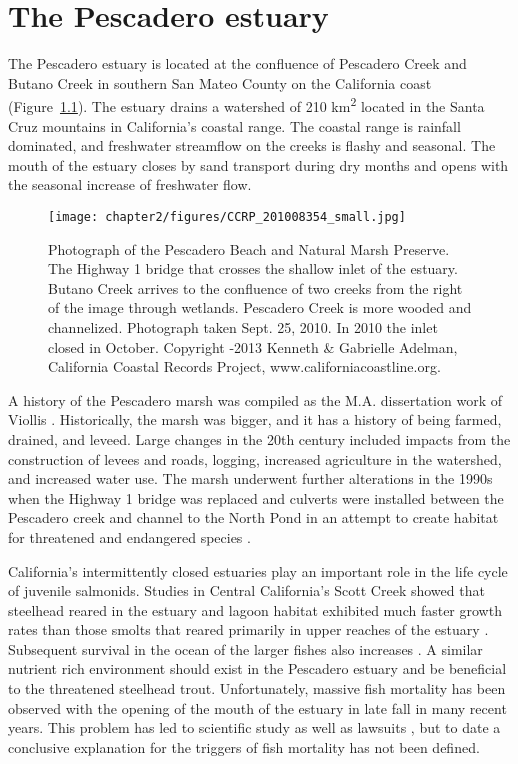 \chapter{The Pescadero estuary} \label{chPescadero}

The Pescadero estuary is located at the confluence of Pescadero Creek and Butano Creek in southern San Mateo County on the California coast (Figure~\ref{fig:ccrp_2010}). The estuary drains a watershed of 210 km\textsuperscript{2} located in the Santa Cruz mountains in California's coastal range. The coastal range is rainfall dominated, and freshwater streamflow on the creeks is flashy and seasonal. The mouth of the estuary closes by sand transport during dry months and opens with the seasonal increase of freshwater flow. 


\begin{figure}
\texttt{[image: chapter2/figures/CCRP\_201008354\_small.jpg]} \caption{Photograph of the Pescadero Beach and Natural Marsh Preserve. The Highway 1 bridge that crosses the shallow inlet of the estuary. Butano Creek arrives to the confluence of two creeks from the right of the image through wetlands. Pescadero Creek is more wooded and channelized. Photograph taken Sept. 25, 2010. In 2010 the inlet closed in October. Copyright -2013 Kenneth \& Gabrielle Adelman, California Coastal Records Project, www.californiacoastline.org.} \label{fig:ccrp_2010} \end{figure}

A history of the Pescadero marsh was compiled as the M.A. dissertation work of Viollis \parencite*{viollis_evolution_1979}. Historically, the marsh was bigger, and it has a history of being farmed, drained, and leveed. Large changes in the 20th century included impacts from the construction of levees and roads, logging, increased agriculture in the watershed, and increased water use. The marsh underwent further alterations in the 1990s when the Highway 1 bridge was replaced and culverts were installed between the Pescadero creek and channel to the North Pond in an attempt to create habitat for threatened and endangered species \parencite{esa_pescadero-butano_2004}.

California's intermittently closed estuaries play an important role in the life cycle of juvenile salmonids. Studies in Central California's Scott Creek showed that steelhead reared in the estuary and lagoon habitat exhibited much faster growth rates than those smolts that reared primarily in upper reaches of the estuary \parencite{hayes_steelhead_2008}. Subsequent survival in the ocean of the larger fishes also increases \parencite{bond_marine_2008}. A similar nutrient rich environment should exist in the Pescadero estuary and be beneficial to the threatened steelhead trout. Unfortunately, massive fish mortality has been observed with the opening of the mouth of the estuary in late fall in many recent years. This problem has led to scientific study \parencite{sloan_ecological_2006, smith_inorganic_2009} as well as lawsuits \parencite{scheck_tiny_2012}, but to date a conclusive explanation for the triggers of fish mortality has not been defined. 

